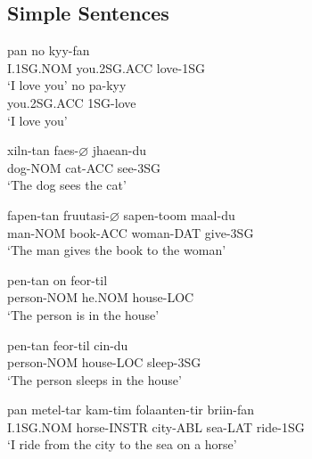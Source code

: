 \documentclass[main.tex]{subfiles}
\begin{document}
\subsection{Simple Sentences}
\begin{exe}
    \ex
        \gll pan no kyy-fan\\
        I.1SG.NOM you.2SG.ACC love-1SG\\
        \trans `I love you'
    \ex
        \gll no pa-kyy\\
        you.2SG.ACC 1SG-love\\
        \trans `I love you'

    \ex \gll xiln-tan faes-$\varnothing$ jhaean-du\\
        dog-NOM cat-ACC see-3SG\\
        \trans `The dog sees the cat'

    \ex \gll fapen-tan fruutasi-$\varnothing$ sapen-toom maal-du\\
        man-NOM book-ACC woman-DAT give-3SG\\
        \trans `The man gives the book to the woman'

    \ex \gll pen-tan on feor-til\\
        person-NOM he.NOM house-LOC\\
        \trans `The person is in the house'

    \ex \gll pen-tan feor-til cin-du\\
        person-NOM house-LOC sleep-3SG\\
        \trans `The person sleeps in the house'

    \ex \gll pan metel-tar kam-tim folaanten-tir briin-fan\\
        I.1SG.NOM horse-INSTR city-ABL sea-LAT ride-1SG\\
        \trans `I ride from the city to the sea on a horse'
\end{exe}
\end{document}

